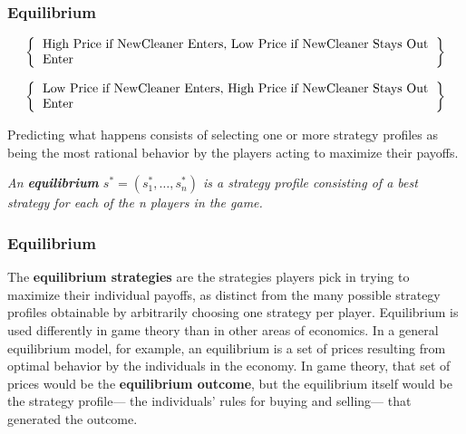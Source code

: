  \begin{frame}[fragile]\frametitle{Equilibrium}
 {\it \begin{center} $$\left\{ \begin{tabular}{l} High Price if NewCleaner
Enters,  Low Price if NewCleaner Stays Out\\ Enter\\ \end{tabular} \right\} $$
\end{center} }

{\it \begin{center} $$\left\{ \begin{tabular}{l} Low Price if NewCleaner Enters,
High Price if NewCleaner Stays Out\\ Enter \end{tabular} \right\} $$
\end{center} }

 Predicting what happens consists of selecting one or more strategy profiles  as
being the most rational behavior by the players acting to maximize their
payoffs.

  {\it An {\bf equilibrium} $s^* = (s_1^*,\ldots,s_n^*)$ is a strategy
profile consisting of a best strategy for each of the {\rm n} players in the
game.}

\end{frame}

 \begin{frame}[fragile]\frametitle{Equilibrium}
 The {\bf equilibrium strategies} are the strategies players pick in trying to
maximize their individual payoffs, as distinct from the many possible strategy
profiles obtainable by arbitrarily choosing one strategy per player.
Equilibrium is used differently in game theory than in other areas of economics.
In a general equilibrium model, for example, an equilibrium is a set of prices
resulting from optimal behavior by the individuals in the economy.  In game
theory, that set of prices would be the {\bf equilibrium outcome}, but the
equilibrium itself would be the strategy profile--- the individuals' rules for
buying and selling--- that generated the outcome.

\end{frame}

